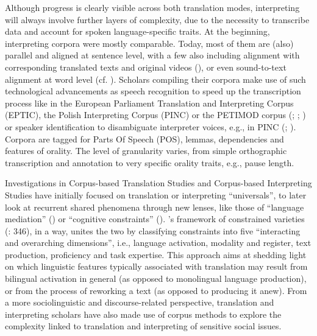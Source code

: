 \documentclass[output=paper]{langscibook}
\begin{document}
Although progress is clearly visible across both translation modes, interpreting will always involve further layers of complexity, due to the necessity to transcribe data and account for spoken language-specific traits. At the beginning, interpreting corpora were mostly comparable. Today, most of them are (also) parallel and aligned at sentence level, with a few also including alignment with corresponding translated texts and original videos (\citealt{FerraresiBernardini2019}), or even sound-to-text alignment at word level (cf. ). Scholars compiling their corpora make use of such technological advancements as speech recognition to speed up the transcription process like in the European Parliament Translation and Interpreting Corpus (EPTIC), the Polish Interpreting Corpus (PINC) or the PETIMOD corpus (\citealt{FerraresiBernardini2019}; \citealt{KorzinekChmiel2021}; ) or speaker identification to disambiguate interpreter voices, e.g., in PINC (\citealt{KorzinekChmiel2021}; ). Corpora are tagged for Parts Of Speech (POS), lemmas, dependencies and features of orality. The level of granularity varies, from simple orthographic transcription and annotation to very specific orality traits, e.g., pause length.

Investigations in Corpus-based Translation Studies and Corpus-based Interpreting Studies have initially focused on translation or interpreting “universals”, to later look at recurrent shared phenomena through new lenses, like those of “language mediation” (\citealt{UlrychMurphy2008}) or “cognitive constraints” (\citealt{LanstyákHeltai2012}). \citeauthor{Kotze2020}’s framework of constrained varieties (\citeyear{Kotze2020}: 346), in a way, unites the two by classifying constraints into five “interacting and overarching dimensions”, i.e., language activation, modality and register, text production, proficiency and task expertise. This approach aims at shedding light on which linguistic features typically associated with translation may result from bilingual activation in general (as  opposed to monolingual language production), or from the process of reworking a text (as opposed to producing it anew). From a more sociolinguistic and discourse-related perspective, translation and interpreting scholars have also made use of corpus methods to explore the complexity linked to translation and interpreting of sensitive social issues.
\end{document}
